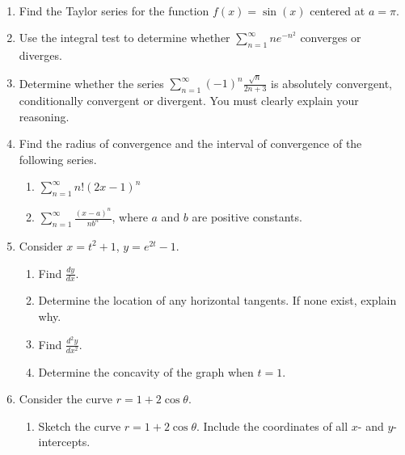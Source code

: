 \documentclass[11pt,fleqn]{article}
\begin{document}
\renewcommand{\headrulewidth}{0pt}
\newcommand{\blank}[1]{\rule{#1}{0.75pt}}
\newcommand{\bc}{\begin{center}}
\newcommand{\ec}{\end{center}}
\renewcommand{\d}{\displaystyle}

\vspace*{-0.7in}

\begin{center}
  \large
  \\
  
\end{center}

\begin{enumerate}  
  \item  Find the Taylor series for the function $f(x) = \sin(x)$ centered at $a=\pi.$
\item  Use the integral test to determine whether $\d
    \sum_{n=1}^{\infty} n e^{-n^2} $ converges or diverges. 
    \item Determine whether the series $\d \sum_{n=1}^{\infty} (-1)^n \frac{\sqrt n}{2n +3}$ is absolutely convergent, conditionally convergent  or
  divergent. You must clearly explain your reasoning. 
\item Find the radius of convergence and the interval of convergence
  of the following series. 

  \begin{enumerate}
  \item $\d \sum_{n=1}^{\infty} n! ( 2x - 1)^n$
  \item $\d \sum_{n=1}^{\infty} \frac{(x-a)^n}{n b^n}$, where $a$ and
    $b$ are positive constants.
  \end{enumerate}



\item Consider $x = t^2 + 1$, $y = e^{2t} - 1$. 
  \begin{enumerate}
  \item Find $\d \frac{dy}{dx}$.
  \item Determine the location of any horizontal tangents. If none
    exist, explain why. 
  \item Find $\d \frac{d^2 y}{dx^2}$.
  \item Determine the concavity of the graph when $t=1.$
  \vfill
  \end{enumerate}
\item Consider the curve $r = 1 + 2 \cos \theta$. 
  \begin{enumerate}
  \item Sketch the curve $r = 1 + 2 \cos \theta$. Include the coordinates of all $x$- and $y$-intercepts.\\
  

\end{enumerate}
\end{enumerate}
\end{document}
